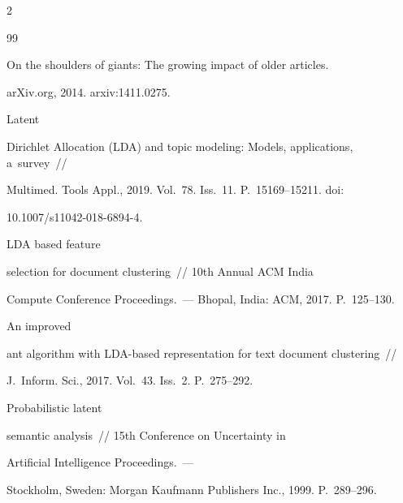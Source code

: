 \begin{multicols}{2}
{{\begin{thebibliography}{99}


 On the shoulders of giants: The growing impact of older articles. 


arXiv.org, 2014. arxiv:1411.0275.







 Latent 


Dirichlet Allocation (LDA) and topic modeling: Models, applications, a~survey~// 


Multimed. Tools  Appl., 2019. Vol.~78. Iss.~11. P.~15169--15211. doi: 


10.1007/s11042-018-6894-4.







 LDA based feature 


selection for document clustering~// 10th Annual ACM India 


Compute Conference Proceedings.~--- Bhopal, India: ACM, 2017. P.~125--130.







 An improved 


ant algorithm with LDA-based representation for text document clustering~// 


J.~Inform. Sci., 2017. Vol.~43. Iss.~2. P.~275--292.







  Probabilistic latent 


semantic analysis~// 15th Conference on Uncertainty in 


Artificial Intelligence Proceedings.~--- 


Stockholm, Sweden: Morgan Kaufmann Publishers Inc.,  1999. P.~289--296.










\end{thebibliography}}}
\end{multicols}
